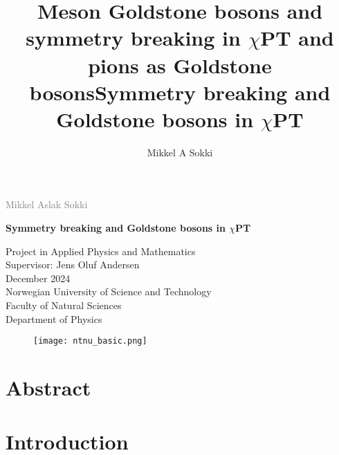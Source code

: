 \documentclass[a4paper, 12pt, openany]{book} %
\author{Mikkel A Sokki}
\title{Meson Goldstone bosons and symmetry breaking in \(\chi\)PT and pions as Goldstone bosons}
\title{Symmetry breaking and Goldstone bosons in \(\chi\)PT}
\begin{document}
	
	\begin{titlepage}
		\vspace*{1.5cm}
		
		\noindent  \textcolor{gray}{\large Mikkel Aslak Sokki} \\
		\vspace{1cm}
		
		\noindent \textbf{\Large Symmetry breaking and Goldstone bosons in \(\chi\)PT} \\
		\vspace{0.5cm}
		
		
		
		
		
		\vspace{7cm}
		\noindent  Project in Applied Physics and Mathematics \\
		Supervisor: Jens Oluf Andersen \\
	
		December 2024 \\
		
		\vspace{0.2cm}
		\noindent Norwegian University of Science and Technology \\
		Faculty of Natural Sciences \\
		Department of Physics \\
		
		\begin{figure}[h]
			\texttt{[image: ntnu\_basic.png]}
		\end{figure}
	\end{titlepage}
	\restoregeometry
	\newpage
	\tableofcontents
	

	
	\chapter*{Abstract}
	
	
	\chapter{Introduction}
	
	
\end{document}

